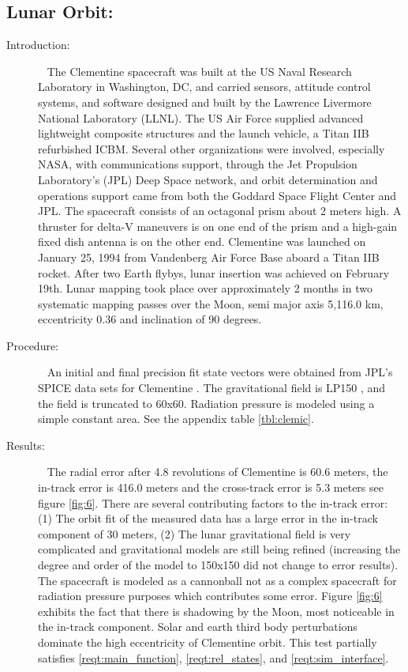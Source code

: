 \subsection{Lunar Orbit:}
\label{test:clem}
\begin{description}
\item[Introduction:] \ \newline
The Clementine spacecraft was built at the US Naval Research Laboratory in Washington,
DC, and carried sensors, attitude control systems, and software designed and built by the
Lawrence Livermore National Laboratory (LLNL). The US Air Force supplied advanced lightweight
composite structures and the launch vehicle, a Titan IIB refurbished ICBM. Several other
organizations were involved, especially NASA, with communications support, through the Jet
Propulsion Laboratory's (JPL) Deep Space network, and orbit determination and operations
support came from both the Goddard Space Flight Center and JPL. The spacecraft consists of
an octagonal prism about 2 meters high. A thruster for delta-V maneuvers is on one end
of the prism and a high-gain fixed dish antenna is on the other end. Clementine was launched
on January 25, 1994 from Vandenberg Air Force Base aboard a Titan IIB rocket. After two Earth
flybys, lunar insertion was achieved on February 19th. Lunar mapping took place over approximately
2 months in two systematic mapping passes over the Moon, semi major axis 5,116.0 km, eccentricity
0.36 and inclination of 90 degrees.
\item[Procedure:]\ \newline
An initial and final precision fit state vectors were obtained from JPL's SPICE data sets for
Clementine \cite{clem}.  The gravitational field is LP150 \cite{Knop}, and the field is
truncated to 60x60. Radiation pressure is modeled using a simple constant area. See the
appendix table \ref{tbl:clemic}.
\item[Results:]\ \newline
The radial error after 4.8 revolutions of Clementine is 60.6 meters, the in-track error
is 416.0 meters and the cross-track error is 5.3 meters see figure \ref{fig:6}. There are
several contributing factors to the in-track error: (1) The orbit fit of the measured data
has a large error in the in-track component of 30 meters, (2) The lunar gravitational
field is very complicated and gravitational models are still being refined \cite{Knop}
(increasing the degree and order of the model to 150x150 did not change to error results).
The spacecraft is modeled as a cannonball not as a complex spacecraft for radiation pressure
purposes which contributes some error. Figure \ref{fig:6} exhibits the fact that there is
shadowing by the Moon, most noticeable in the in-track component. Solar and earth third body
perturbations dominate the high eccentricity of Clementine orbit. This test partially satisfies
\ref{reqt:main_function}, \ref{reqt:rel_states}, and \ref{reqt:sim_interface}.


\end{description}
